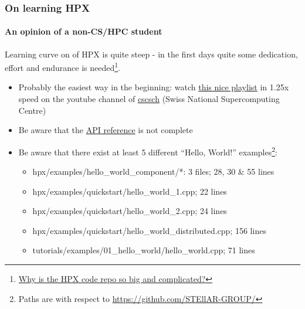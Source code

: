 \begin{frame}
\frametitle{On learning HPX}
\framesubtitle{An opinion of a non-CS/HPC student}
Learning curve on of HPX is quite steep - in the first days quite some dedication, effort and endurance is needed\footnote{\color{fzjblue} \href{https://github.com/STEllAR-GROUP/tutorials/blob/master/hlrs2017/session1/README.md}{Why is the HPX code repo so big and complicated?}}.
\begin{itemize}
  \item Probably the easiest way in the beginning: watch
    \color{fzjblue}\href{https://www.youtube.com/playlist?list=PL1tk5lGm7zvSXfS-sqOOmIJ0lFNjKze18}{this nice playlist}
    \color{black} in 1.25x speed on the youtube channel of
    \color{fzjblue}\href{https://www.youtube.com/user/cscsch}{cscsch}
    \color{black}(Swiss National Supercomputing Centre)
  \item Be aware that the
    \color{fzjblue}\href{https://stellar-group.github.io/hpx/docs/sphinx/latest/html/api.html}{API reference}
    \color{black}is not complete
  \item Be aware that there exist at least 5 different ``Hello, World!'' examples\footnote{Paths are with respect to \color{fzjblue}\url{https://github.com/STEllAR-GROUP/}\color{black}}:
  \begin{itemize}
    \item hpx/examples/hello\_world\_component/*: 3 files; 28, 30 \& 55 lines
    \item hpx/examples/quickstart/hello\_world\_1.cpp; 22 lines
    \item hpx/examples/quickstart/hello\_world\_2.cpp; 24 lines
    \item hpx/examples/quickstart/hello\_world\_distributed.cpp; 156 lines
    \item tutorials/examples/01\_hello\_world/hello\_world.cpp; 71 lines
  \end{itemize}
\end{itemize}
\end{frame}

